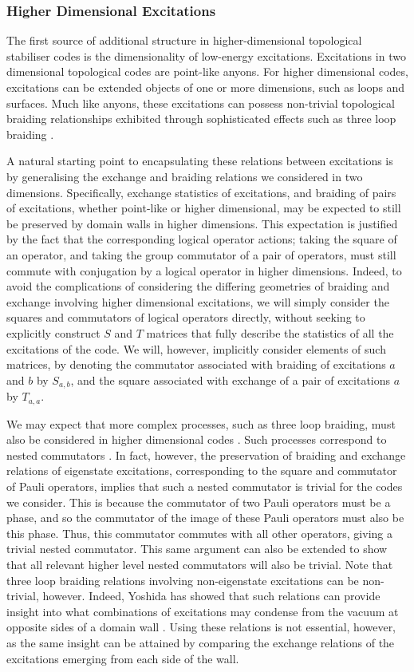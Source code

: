 \documentclass[pra,twocolumn,a4paper,nofootinbib]{revtex4-1}
\begin{document}
\subsubsection{Higher Dimensional Excitations}
The first source of additional structure in higher-dimensional topological stabiliser codes is the dimensionality of low-energy excitations.  Excitations in two dimensional topological codes are point-like anyons.  For higher dimensional codes, excitations can be extended objects of one or more dimensions, such as loops and surfaces.  Much like anyons, these excitations can possess non-trivial topological braiding relationships exhibited through sophisticated effects such as three loop braiding \cite{WangLevin}.

A natural starting point to encapsulating these relations between excitations is by generalising the exchange and braiding relations we considered in two dimensions. Specifically, exchange statistics of excitations, and braiding of pairs of excitations, whether point-like or higher dimensional, may be expected to still be preserved by domain walls in higher dimensions. This expectation is justified by the  fact that the corresponding logical operator actions; taking the square of an operator, and taking the group commutator of a pair of operators, must still commute with conjugation by a logical operator in higher dimensions. Indeed, to avoid the complications of considering the differing geometries of braiding and exchange involving higher dimensional excitations, we will simply consider the squares and commutators of logical operators directly, without seeking to explicitly construct $S$ and $T$ matrices that fully describe the statistics of all the excitations of the code. We will, however, implicitly consider elements of such matrices, by denoting the commutator associated with braiding of excitations $a$ and $b$ by $S_{a,b}$, and the square associated with exchange of a pair of excitations $a$ by $T_{a,a}$.

We may expect that more complex processes, such as three loop braiding, must also be considered in higher dimensional codes \cite{WangLevin,YoshidaA}. Such processes correspond to nested commutators \cite{YoshidaA,YoshidaC}. In fact, however, the preservation of braiding and exchange relations of eigenstate excitations, corresponding to the square and commutator of Pauli operators, implies that such a nested commutator is trivial for the codes we consider. This is because the commutator of two Pauli operators must be a phase, and so the commutator of the image of these Pauli operators must also be this phase. Thus, this commutator commutes with all other operators, giving a trivial nested commutator. This same argument can also be extended to show that all relevant higher level nested commutators will also be trivial. Note that three loop braiding relations involving non-eigenstate excitations can be non-trivial, however. Indeed, Yoshida has showed that such relations can provide insight into what combinations of excitations may condense from the vacuum at opposite sides of a domain wall \cite{YoshidaA}. Using these relations is not essential, however, as the same insight can be attained by comparing the exchange relations of the excitations emerging from each side of the wall.
\end{document}
